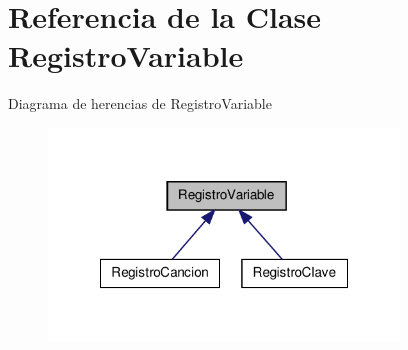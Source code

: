 \hypertarget{class_registro_variable}{\section{\-Referencia de la \-Clase \-Registro\-Variable}
\label{class_registro_variable}
}


\-Diagrama de herencias de \-Registro\-Variable
\nopagebreak
\begin{figure}[H]
\begin{center}
\leavevmode
\includegraphics[width=264pt]{class_registro_variable__inherit__graph}
\end{center}
\end{figure}
